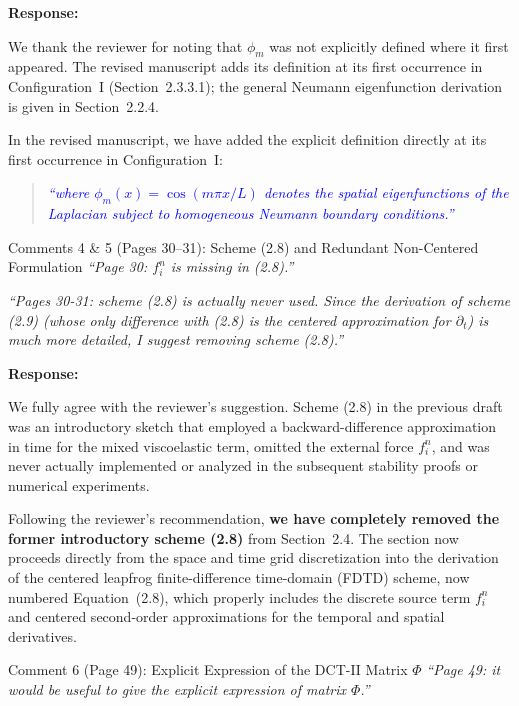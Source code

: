 \documentclass[11pt,a4paper]{article}
\newenvironment{response}{
    \par\vspace{1mm}\noindent\textbf{\textcolor{responseframe}{Response:}}\par\vspace{1mm}
}{
    \par\vspace{3mm}
}
\begin{document}
\begin{response}
We thank the reviewer for noting that $\phi_m$ was not explicitly defined where it first appeared. The revised manuscript adds its definition at its first occurrence in Configuration~I (Section~2.3.3.1); the general Neumann eigenfunction derivation is given in Section~2.2.4.

In the revised manuscript, we have added the explicit definition directly at its first occurrence in Configuration~I:
\begin{quote}
\textcolor{blue}{\emph{``where $\phi_m(x) = \cos(m\pi x / L)$ denotes the spatial eigenfunctions of the Laplacian subject to homogeneous Neumann boundary conditions.''}}
\end{quote}
\end{response}

\vspace{2mm}
\begin{revcomment}{Comments 4 \& 5 (Pages 30--31): Scheme (2.8) and Redundant Non-Centered Formulation}
\emph{``Page 30: $f_i^n$ is missing in (2.8).''}

\emph{``Pages 30-31: scheme (2.8) is actually never used. Since the derivation of scheme (2.9) (whose only difference with (2.8) is the centered approximation for $\partial_t$) is much more detailed, I suggest removing scheme (2.8).''}
\end{revcomment}

\begin{response}
We fully agree with the reviewer's suggestion. Scheme (2.8) in the previous draft was an introductory sketch that employed a backward-difference approximation in time for the mixed viscoelastic term, omitted the external force $f_i^n$, and was never actually implemented or analyzed in the subsequent stability proofs or numerical experiments.

Following the reviewer's recommendation, \textbf{we have completely removed the former introductory scheme (2.8)} from Section~2.4. The section now proceeds directly from the space and time grid discretization into the derivation of the centered leapfrog finite-difference time-domain (FDTD) scheme, now numbered Equation~(2.8), which properly includes the discrete source term $f_i^n$ and centered second-order approximations for the temporal and spatial derivatives.
\end{response}

\vspace{2mm}
\begin{revcomment}{Comment 6 (Page 49): Explicit Expression of the DCT-II Matrix $\Phi$}
\emph{``Page 49: it would be useful to give the explicit expression of matrix $\Phi$.''}
\end{revcomment}
\end{document}
